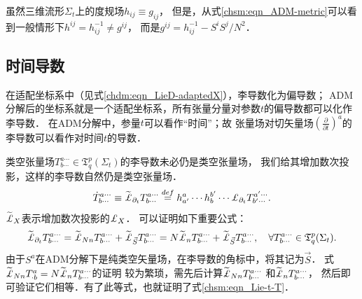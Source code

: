虽然三维流形$\Sigma_t$上的度规场$h_{ij}\equiv g_{ij}$，
但是，从式\eqref{chsm:eqn_ADM-metric}可以看到一般情形下$h^{ij}=h_{ij}^{-1}\neq g^{ij}$，
而是$g^{ij}=h_{ij}^{-1} - S^i S^j/N^2$．




\subsection{时间导数}

在适配坐标系中（见式\eqref{chdm:eqn_LieD-adaptedX}），李导数化为偏导数；
ADM分解后的坐标系就是一个适配坐标系，所有张量分量对参数$t$的偏导数都可以化作李导数．
在ADM分解中，参量$t$可以看作“时间”；故
张量场对切矢量场$(\frac{\partial }{\partial t})^a$的李导数可以看作对时间$t$的导数．

类空张量场$T^{a\cdots}_{b\cdots}\in \mathfrak{T}^p_q(\Sigma_t)$的李导数未必仍是类空张量场，
我们给其增加数次投影，这样的李导数自然仍是类空张量场．
\begin{equation}
    \dot{T}^{a\cdots}_{b\cdots} \equiv \widetilde{\Lie}_{\partial_t}{T}^{a\cdots}_{b\cdots}
    \overset{def}{=} h^a_{a'}\cdots h^{b'}_{b}\cdots {\Lie}_{\partial_t}{T}^{a'\cdots}_{b'\cdots} .
\end{equation}
$\widetilde{\Lie}_X$表示增加数次投影的${\Lie}_X$．
可以证明如下重要公式：
\begin{equation}\label{chsm:eqn_Lie-t-T}
    \widetilde{\Lie}_{\partial_t}{T}^{a\cdots}_{b\cdots}
    = \widetilde{\Lie}_{N n}{T}^{a\cdots}_{b\cdots}
     +\widetilde{\Lie}_{\vec{S}}{T}^{a\cdots}_{b\cdots}
    = N \widetilde{\Lie}_{n}{T}^{a\cdots}_{b\cdots}
    +\widetilde{\Lie}_{\vec{S}}{T}^{a\cdots}_{b\cdots} ,
    \quad \forall T^{a\cdots}_{b\cdots}\in \mathfrak{T}^p_q(\Sigma_t).
\end{equation}
由于$S^a$在ADM分解下是纯类空矢量场，在李导数的角标中，将其记为$\vec{S}$．
式$\widetilde{\Lie}_{Nn}{T}^a_{\cdot b}=N\widetilde{\Lie}_{n}{T}^{a\cdots}_{b\cdots}$的证明
较为繁琐，需先后计算$\widetilde{\Lie}_{Nn}{T}^{a\cdots}_{b\cdots}$
和$\widetilde{\Lie}_{n}{T}^{a\cdots}_{b\cdots}$，
然后即可验证它们相等．有了此等式，也就证明了式\eqref{chsm:eqn_Lie-t-T}．

